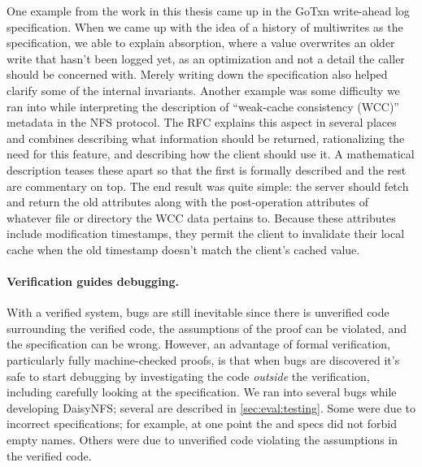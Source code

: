 One example from the work in this thesis came up in the GoTxn write-ahead log
specification. When we came up with the idea of a history of multiwrites as the
specification, we able to explain absorption, where a value overwrites an older
write that hasn't been logged yet, as an optimization and not a detail the
caller should be concerned with. Merely writing down the specification also
helped clarify some of the internal invariants. Another example was some
difficulty we ran into while interpreting the description of ``weak-cache consistency
(WCC)'' metadata in the NFS protocol. The RFC explains this aspect in several
places and combines describing what information should be returned, rationalizing
the need for this feature, and describing how the client should use it. A
mathematical description teases these apart so that the first is formally
described and the rest are commentary on top. The end result was quite simple:
the server should fetch and return the old attributes along with the post-operation attributes of
whatever file or directory the WCC data pertains to. Because these attributes
include modification timestamps, they permit the client to invalidate their
local cache when the old timestamp doesn't match the client's cached value.

\paragraph{Verification guides debugging.} With a verified system, bugs are
still inevitable since there is unverified code surrounding the verified code,
the assumptions of the proof can be violated, and the specification can be
wrong. However, an advantage of formal verification, particularly fully
machine-checked proofs, is that when bugs are discovered it's safe to start
debugging by investigating the code \emph{outside} the verification, including
carefully looking at the
specification. We ran into several bugs while developing DaisyNFS; several are
described in \cref{sec:eval:testing}. Some were due
to incorrect specifications; for example, at one point the  and
 specs did not forbid empty names. Others were due to unverified code
violating the assumptions in the verified code.

